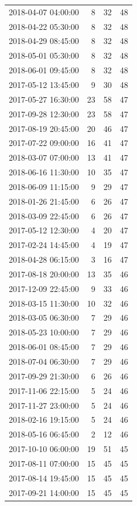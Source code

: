 \begin{tabular}{lrrr}
2018-04-07 04:00:00 & 8 & 32 & 48 \\
2018-04-22 05:30:00 & 8 & 32 & 48 \\
2018-04-29 08:45:00 & 8 & 32 & 48 \\
2018-05-01 05:30:00 & 8 & 32 & 48 \\
2018-06-01 09:45:00 & 8 & 32 & 48 \\
2017-05-12 13:45:00 & 9 & 30 & 48 \\
2017-05-27 16:30:00 & 23 & 58 & 47 \\
2017-09-28 12:30:00 & 23 & 58 & 47 \\
2017-08-19 20:45:00 & 20 & 46 & 47 \\
2017-07-22 09:00:00 & 16 & 41 & 47 \\
2018-03-07 07:00:00 & 13 & 41 & 47 \\
2018-06-16 11:30:00 & 10 & 35 & 47 \\
2018-06-09 11:15:00 & 9 & 29 & 47 \\
2018-01-26 21:45:00 & 6 & 26 & 47 \\
2018-03-09 22:45:00 & 6 & 26 & 47 \\
2017-05-12 12:30:00 & 4 & 20 & 47 \\
2017-02-24 14:45:00 & 4 & 19 & 47 \\
2018-04-28 06:15:00 & 3 & 16 & 47 \\
2017-08-18 20:00:00 & 13 & 35 & 46 \\
2017-12-09 22:45:00 & 9 & 33 & 46 \\
2018-03-15 11:30:00 & 10 & 32 & 46 \\
2018-03-05 06:30:00 & 7 & 29 & 46 \\
2018-05-23 10:00:00 & 7 & 29 & 46 \\
2018-06-01 08:45:00 & 7 & 29 & 46 \\
2018-07-04 06:30:00 & 7 & 29 & 46 \\
2017-09-29 21:30:00 & 6 & 26 & 46 \\
2017-11-06 22:15:00 & 5 & 24 & 46 \\
2017-11-27 23:00:00 & 5 & 24 & 46 \\
2018-02-16 19:15:00 & 5 & 24 & 46 \\
2018-05-16 06:45:00 & 2 & 12 & 46 \\
2017-10-10 06:00:00 & 19 & 51 & 45 \\
2017-08-11 07:00:00 & 15 & 45 & 45 \\
2017-08-14 19:45:00 & 15 & 45 & 45 \\
2017-09-21 14:00:00 & 15 & 45 & 45 \\

\end{tabular}
